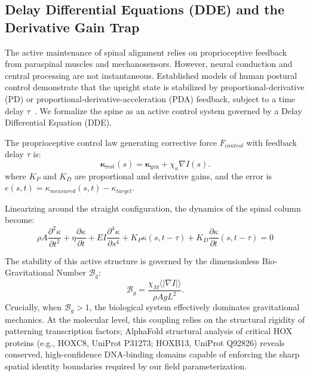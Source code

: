 \subsection{Delay Differential Equations (DDE) and the Derivative Gain Trap}

The active maintenance of spinal alignment relies on proprioceptive feedback from paraspinal muscles and mechanosensors. However, neural conduction and central processing are not instantaneous. Established models of human postural control demonstrate that the upright state is stabilized by proportional-derivative (PD) or proportional-derivative-acceleration (PDA) feedback, subject to a time delay $\tau$~\cite{milton2009time, insperger2013acceleration}. We formalize the spine as an active control system governed by a Delay Differential Equation (DDE).

The proprioceptive control law generating corrective force $F_{control}$ with feedback delay $\tau$ is:
\begin{equation}
\boldsymbol{\kappa}_{\mathrm{rest}}(s) = \boldsymbol{\kappa}_{\mathrm{gen}} + \chi_\kappa \nabla I(s).
\label{eq:kappa_rest_field_supp}
\end{equation}
where $K_P$ and $K_D$ are proportional and derivative gains, and the error is $e(s,t) = \kappa_{measured}(s,t) - \kappa_{target}$.

Linearizing around the straight configuration, the dynamics of the spinal column become:
\begin{equation}
\rho A \frac{\partial^2 \kappa}{\partial t^2} + \eta \frac{\partial \kappa}{\partial t} + EI \frac{\partial^4 \kappa}{\partial s^4} + K_P \kappa(s, t-\tau) + K_D \frac{\partial \kappa}{\partial t}(s, t-\tau) = 0
\label{eq:dde_spine_supp}
\end{equation}

The stability of this active structure is governed by the dimensionless Bio-Gravitational Number $\mathcal{B}_g$:
\begin{equation}
\mathcal{B}_g = \frac{\chi_M \langle |\nabla I| \rangle}{\rho A g L^2}.
\label{eq:bg_number_info_supp}
\end{equation}
Crucially, when $\mathcal{B}_g > 1$, the biological system effectively dominates gravitational mechanics. At the molecular level, this coupling relies on the structural rigidity of patterning transcription factors; AlphaFold structural analysis of critical HOX proteins (e.g., HOXC8, UniProt P31273; HOXB13, UniProt Q92826) reveals conserved, high-confidence DNA-binding domains capable of enforcing the sharp spatial identity boundaries required by our field parameterization.

